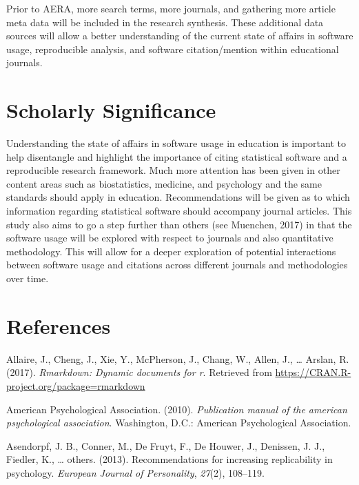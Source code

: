 \documentclass[english,floatsintext,man]{apa6}
\theoremstyle{definition}
\theoremstyle{definition}
\theoremstyle{remark}
\begin{document}
Prior to AERA, more search terms, more journals, and gathering more
article meta data will be included in the research synthesis. These
additional data sources will allow a better understanding of the current
state of affairs in software usage, reproducible analysis, and software
citation/mention within educational journals.

\section{Scholarly Significance}\label{scholarly-significance}

Understanding the state of affairs in software usage in education is
important to help disentangle and highlight the importance of citing
statistical software and a reproducible research framework. Much more
attention has been given in other content areas such as biostatistics,
medicine, and psychology and the same standards should apply in
education. Recommendations will be given as to which information
regarding statistical software should accompany journal articles. This
study also aims to go a step further than others (see Muenchen, 2017) in
that the software usage will be explored with respect to journals and
also quantitative methodology. This will allow for a deeper exploration
of potential interactions between software usage and citations across
different journals and methodologies over time.

\section{References}\label{references}

\setlength{\parindent}{-0.5in} \setlength{\leftskip}{0.5in}

\hypertarget{refs}{}
\hypertarget{ref-rmarkdown}{}
Allaire, J., Cheng, J., Xie, Y., McPherson, J., Chang, W., Allen, J.,
\ldots{} Arslan, R. (2017). \emph{Rmarkdown: Dynamic documents for r}.
Retrieved from \url{https://CRAN.R-project.org/package=rmarkdown}

\hypertarget{ref-apa}{}
American Psychological Association. (2010). \emph{Publication manual of
the american psychological association}. Washington, D.C.: American
Psychological Association.

\hypertarget{ref-asendorpf2013}{}
Asendorpf, J. B., Conner, M., De Fruyt, F., De Houwer, J., Denissen, J.
J., Fiedler, K., \ldots{} others. (2013). Recommendations for increasing
replicability in psychology. \emph{European Journal of Personality},
\emph{27}(2), 108--119.
\end{document}
